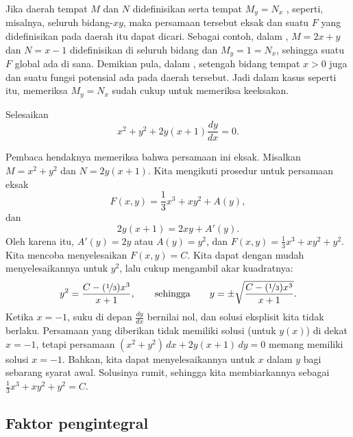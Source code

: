Jika daerah tempat $M$ dan $N$ didefinisikan serta tempat $M_y=N_x$
, seperti, misalnya, seluruh bidang-$xy$,
maka persamaan tersebut eksak dan suatu $F$ yang didefinisikan pada daerah itu dapat dicari.
Sebagai contoh, dalam ,
$M=2x+y$ dan $N=x-1$ didefinisikan di seluruh bidang dan
$M_y = 1 = N_x$, sehingga suatu $F$ global ada di sana.
Demikian pula, dalam ,
setengah bidang tempat $x > 0$ juga 
dan suatu fungsi potensial ada pada daerah tersebut.
Jadi dalam kasus seperti itu, memeriksa
$M_y = N_x$ sudah cukup untuk memeriksa keeksakan.

\begin{example} \label{exact:exampleabove}
Selesaikan
\begin{equation*}
x^2+y^2 + 2y(x+1) \frac{dy}{dx} = 0 .
\end{equation*}

Pembaca hendaknya memeriksa bahwa persamaan ini eksak.
Misalkan $M= x^2+y^2$ dan $N=2y(x+1)$.
Kita mengikuti prosedur untuk persamaan eksak
\begin{equation*}
F(x,y) = \frac{1}{3}x^3 + xy^2 + A(y) ,
\end{equation*}
dan
\begin{equation*}
2y(x+1) = 2xy + A'(y) .
\end{equation*}
Oleh karena itu, $A'(y) = 2y$ atau $A(y) = y^2$, dan $F(x,y) = \frac{1}{3}x^3 + xy^2 +
y^2$.
Kita mencoba menyelesaikan $F(x,y) = C$.  Kita dapat dengan mudah menyelesaikannya untuk $y^2$, lalu cukup mengambil
akar kuadratnya:
\begin{equation*}
y^2 = \frac{C-(\nicefrac{1}{3})x^3}{x+1},
\qquad \text{sehingga} \qquad
y = \pm \sqrt{\frac{C-(\nicefrac{1}{3})x^3}{x+1}} .
\end{equation*}
Ketika $x=-1$, suku di depan $\frac{dy}{dx}$ bernilai nol,
dan solusi eksplisit kita tidak berlaku.
Persamaan yang diberikan tidak memiliki solusi (untuk $y(x)$) di dekat $x=-1$, tetapi
persamaan $(x^2+y^2) \, dx + 2y(x+1) \, dy = 0$ memang memiliki
solusi $x=-1$.  Bahkan, kita dapat menyelesaikannya untuk $x$ dalam
$y$ bagi sebarang syarat awal.  Solusinya rumit,
sehingga kita membiarkannya sebagai $\frac{1}{3}x^3 + xy^2 + y^2 = C$.
\end{example}

\subsection{Faktor pengintegral}

